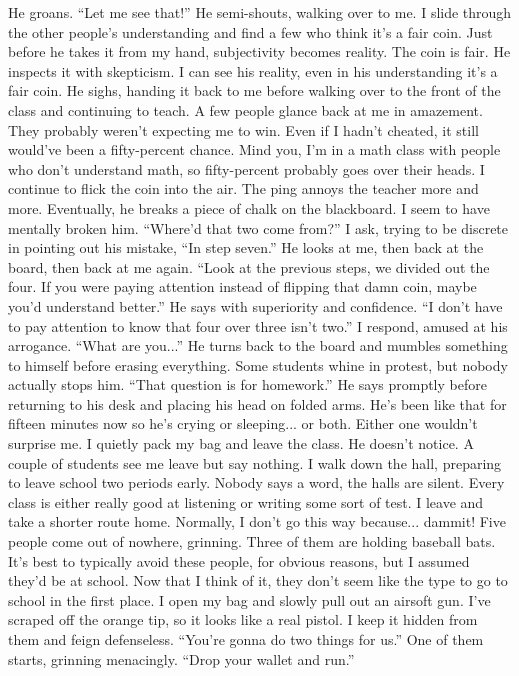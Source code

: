 \documentclass[a4paper, 12pt]{book}
\begin{document}
\newline
\tab
He groans. ``Let me see that!'' He semi-shouts, walking over to me. I slide through the other people’s understanding and find a few who think it’s a fair coin. Just before he takes it from my hand, subjectivity becomes reality. The coin is fair. He inspects it with skepticism. I can see his reality, even in his understanding it’s a fair coin. He sighs, handing it back to me before walking over to the front of the class and continuing to teach.
\newline
\tab
A few people glance back at me in amazement. They probably weren’t expecting me to win. Even if I hadn’t cheated, it still would’ve been a fifty-percent chance. Mind you, I’m in a math class with people who don’t understand math, so fifty-percent probably goes over their heads. I continue to flick the coin into the air. The ping annoys the teacher more and more. Eventually, he breaks a piece of chalk on the blackboard. I seem to have mentally broken him. ``Where’d that two come from?'' I ask, trying to be discrete in pointing out his mistake, ``In step seven.''
\newline
\tab
He looks at me, then back at the board, then back at me again. ``Look at the previous steps, we divided out the four. If you were paying attention instead of flipping that damn coin, maybe you’d understand better.'' He says with superiority and confidence.
\newline
\tab
``I don’t have to pay attention to know that four over three isn’t two.'' I respond, amused at his arrogance.
\newline
\tab
``What are you...'' He turns back to the board and mumbles something to himself before erasing everything. Some students whine in protest, but nobody actually stops him. ``That question is for homework.'' He says promptly before returning to his desk and placing his head on folded arms.
\newline
\tab
He’s been like that for fifteen minutes now so he’s crying or sleeping... or both. Either one wouldn’t surprise me. I quietly pack my bag and leave the class. He doesn’t notice. A couple of students see me leave but say nothing. I walk down the hall, preparing to leave school two periods early. Nobody says a word, the halls are silent. Every class is either really good at listening or writing some sort of test.
\newline
\tab
I leave and take a shorter route home. Normally, I don’t go this way because... dammit! Five people come out of nowhere, grinning. Three of them are holding baseball bats. It’s best to typically avoid these people, for obvious reasons, but I assumed they’d be at school. Now that I think of it, they don’t seem like the type to go to school in the first place. I open my bag and slowly pull out an airsoft gun. I’ve scraped off the orange tip, so it looks like a real pistol. I keep it hidden from them and feign defenseless. ``You’re gonna do two things for us.'' One of them starts, grinning menacingly. ``Drop your wallet and run.''
\end{document}
